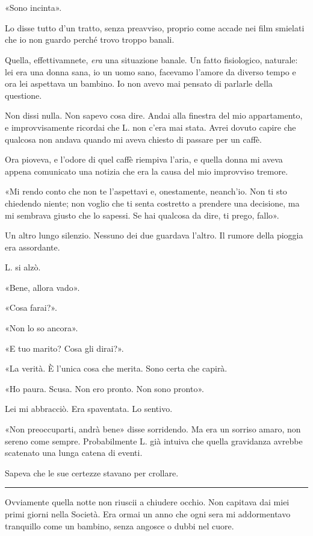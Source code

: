 \chapter{}
\label{ch:5}

«Sono incinta».

Lo disse tutto d'un tratto, senza preavviso, proprio come accade nei film smielati che io non guardo
perché trovo troppo banali.

Quella, effettivamnete, \emph{era} una situazione banale. Un fatto fisiologico, naturale: lei era
una donna sana, io un uomo sano, facevamo l'amore da diverso tempo e ora lei aspettava un bambino.
Io non avevo mai pensato di parlarle della questione.

Non dissi nulla. Non sapevo cosa dire. Andai alla finestra del mio appartamento, e improvvisamente
ricordai che L. non c'era mai stata. Avrei dovuto capire che qualcosa non andava quando mi aveva
chiesto di passare per un caffè.

Ora pioveva, e l'odore di quel caffè riempiva l'aria, e quella donna mi aveva appena comunicato una
notizia che era la causa del mio improvviso tremore.

«Mi rendo conto che non te l'aspettavi e, onestamente, neanch'io. Non ti sto chiedendo niente; non
voglio che ti senta costretto a prendere una decisione, ma mi sembrava giusto che lo sapessi. Se hai
qualcosa da dire, ti prego, fallo».

Un altro lungo silenzio. Nessuno dei due guardava l'altro. Il rumore della pioggia era assordante.

L. si alzò.

«Bene, allora vado».

«Cosa farai?».

«Non lo so ancora».

«E tuo marito? Cosa gli dirai?».

«La verità. È l'unica cosa che merita. Sono certa che capirà.

«Ho paura. Scusa. Non ero pronto. Non sono pronto».

Lei mi abbracciò. Era spaventata. Lo sentivo.

«Non preoccuparti, andrà bene» disse sorridendo. Ma era un sorriso amaro, non sereno come sempre.
Probabilmente L. già intuiva che quella gravidanza avrebbe scatenato una lunga catena di eventi.

Sapeva che le sue certezze stavano per crollare.

\plainbreak{1}

Ovviamente quella notte non riuscii a chiudere occhio. Non capitava dai miei primi giorni nella
Società. Era ormai un anno che ogni sera mi addormentavo tranquillo come un bambino, senza angosce o
dubbi nel cuore.

